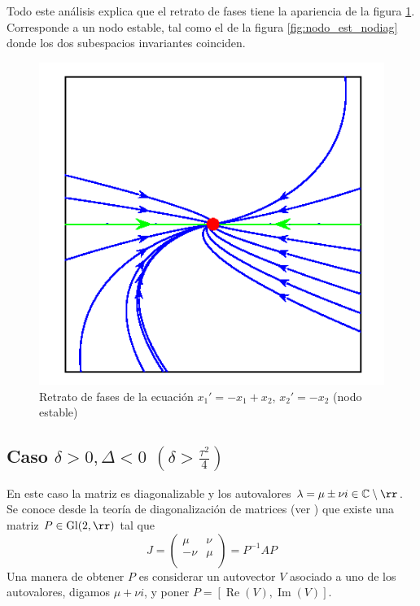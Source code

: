 Todo este análisis explica que el retrato de fases tiene la apariencia de la figura \ref{fig:nodo_est_nodiag2}. Corresponde a un nodo estable, tal como el de la figura  \ref{fig:nodo_est_nodiag} donde los dos subespacios invariantes coinciden.

\begin{figure}[h]
\begin{center}
\includegraphics[scale=.5]{imagenes/nodo_est_nodiag2.png}
\end{center}
\caption{Retrato de fases de la ecuación $x_1'=-x_1+x_2$,
$x_2'=-x_2$ (nodo estable)}\label{fig:nodo_est_nodiag2}

\end{figure}



\subsection{Caso $\delta>0, \Delta<0$ $(\delta>\frac{\tau^2}{4})$}

En este caso la matriz es diagonalizable y los autovalores $\lambda=\mu\pm\nu i\in\mathbb{C}\setminus\rr$. Se conoce desde la teoría de diagonalización de matrices (ver \cite{CarlD.Meyer538}) que existe una matriz $P\in \operatorname{Gl}(2,\rr)$ tal que 
\[
 J=\begin{pmatrix}
     \mu & \nu \\ -\nu & \mu\\
    \end{pmatrix}
=
P^{-1}AP
\]
Una manera de obtener $P$ es considerar un autovector $V$ asociado a uno de los autovalores, digamos $\mu+\nu i$, y poner $P=[\operatorname{Re}(V),\operatorname{Im}(V)]$. 

